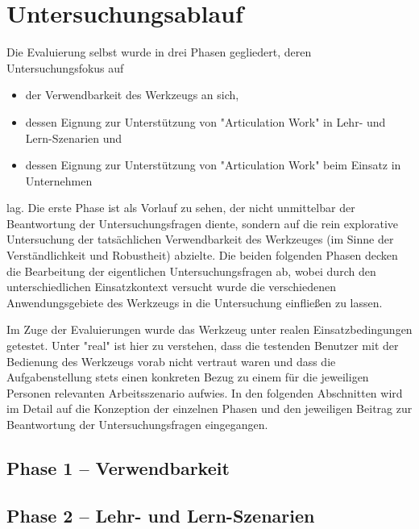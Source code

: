 
\section{Untersuchungsablauf} %
\label{sec:untersuchungsablauf}

Die Evaluierung selbst wurde in drei Phasen gegliedert, deren Untersuchungsfokus auf 
\begin{itemize}
	\item der Verwendbarkeit des Werkzeugs an sich,  
	\item dessen Eignung zur Unterstützung von "Articulation Work" in Lehr- und Lern-Szenarien und
	\item dessen Eignung zur Unterstützung von "Articulation Work" beim Einsatz in Unternehmen
\end{itemize}
lag. Die erste Phase ist als Vorlauf zu sehen, der nicht unmittelbar der Beantwortung der Untersuchungsfragen diente, sondern auf die rein explorative Untersuchung der tatsächlichen Verwendbarkeit des Werkzeuges (im Sinne der Verständlichkeit und Robustheit) abzielte. Die beiden folgenden Phasen decken die Bearbeitung der eigentlichen Untersuchungsfragen ab, wobei durch den unterschiedlichen Einsatzkontext versucht wurde die verschiedenen Anwendungsgebiete des Werkzeugs in die Untersuchung einfließen zu lassen.

Im Zuge der Evaluierungen wurde das Werkzeug unter realen Einsatzbedingungen getestet. Unter "real" ist hier zu verstehen, dass die testenden Benutzer mit der Bedienung des Werkzeugs vorab nicht vertraut waren und dass die Aufgabenstellung stets einen konkreten Bezug zu einem für die jeweiligen Personen relevanten Arbeitsszenario aufwies. In den folgenden Abschnitten wird im Detail auf die Konzeption der einzelnen Phasen und den jeweiligen Beitrag zur Beantwortung der Untersuchungsfragen eingegangen.

\subsection{Phase 1 – Verwendbarkeit} %
\label{sub:phase_1_verwendbarkeit}


\subsection{Phase 2 – Lehr- und Lern-Szenarien} %
\label{sub:phase_2_lehr_und_lern_szenarien}


